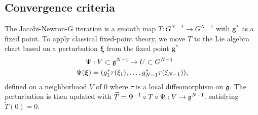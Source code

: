 \subsection{Convergence criteria}\label{sec:lie-convergence}

The Jacobi-Newton-G iteration is a smooth map $T : G^{N-1} \to G^{N-1}$ with $\mathbf{g}^*$ as a fixed point.
To apply classical fixed-point theory, we move $T$ to the Lie algebra chart based on a perturbation $\mathbf{\xi}$ from the fixed point $\mathbf{g}^*$
\begin{align*}
	\Psi                  & : V \subset {\mathfrak{g}}^{N-1} \to U \subset G^{N-1}             \\
	\Psi(\boldsymbol \xi) & = (g_1^*\tau(\xi_1), \ldots, g_{N-1}^*\tau(\xi_{N-1})),
\end{align*}
defined on a neighborhood $V$ of $0$ where $\tau$ is a local diffeomorphism on ${\mathfrak{g}}$.
The perturbation is then updated with $\widetilde{T} = \Psi^{-1} \circ T \circ \Psi : V \to {\mathfrak{g}}^{N-1}$, satisfying $\widetilde{T}(0) = 0$.

